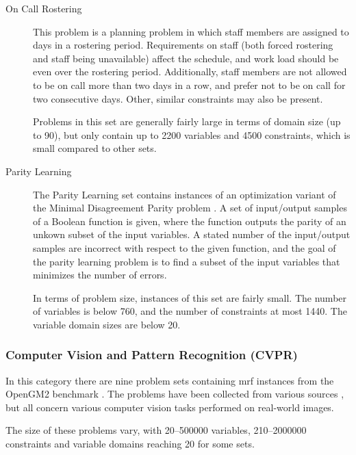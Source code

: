 \begin{description}
	\item[On Call Rostering]
		This problem is a planning problem in which staff members are assigned to days in a rostering period.
		Requirements on staff (both forced rostering and staff being unavailable) affect the schedule, and work load should be even over the rostering period.
		Additionally, staff members are not allowed to be on call more than two days in a row, and prefer not to be on call for two consecutive days.
		Other, similar constraints may also be present.

		Problems in this set are generally fairly large in terms of domain size (up to \num{90}), but only contain up to \num{2200} variables and \num{4500} constraints, which is small compared to other sets.
	
	\item[Parity Learning]
		The Parity Learning set contains instances of an optimization variant of the Minimal Disagreement Parity problem \parencite{Crawford94}.
		A set of input/output samples of a Boolean function is given, where the function outputs the parity of an unkown subset of the input variables.
		A stated number of the input/output samples are incorrect with respect to the given function, and the goal of the parity learning problem is to find a subset of the input variables that minimizes the number of errors.

		In terms of problem size, instances of this set are fairly small. The number of variables is below \num{760}, and the number of constraints at most \num{1440}. The variable domain sizes are below \num{20}.
\end{description}

\subsubsection{Computer Vision and Pattern Recognition (CVPR)}
In this category there are nine problem sets containing \gls{mrf} instances from the OpenGM2 benchmark \parencite{Kappes13}.
The problems have been collected from various sources \parencite[\pno~1330]{Kappes13}, but all concern various computer vision tasks performed on real-world images.

The size of these problems vary, with \numrange{20}{500000} variables, \numrange{210}{2000000} constraints and variable domains reaching \num{20} for some sets.

